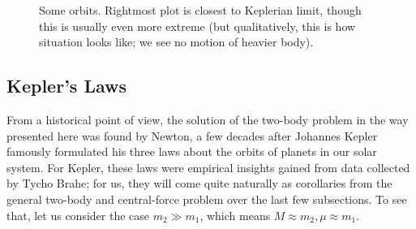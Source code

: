 \documentclass[../class_mech_main.tex]{subfiles}
\begin{document}
\begin{figure}
	\centering

	\hspace{0.1\textwidth}%
	\hspace{0.1\textwidth}%

	\caption{Some orbits. Rightmost plot is closest to Keplerian limit, though this is usually even more extreme (but qualitatively, this is how situation looks like; we see no motion of heavier body).}
	\label{fig:central_force_orbits}
\end{figure}



		\subsection{Kepler's Laws}
From a historical point of view, the solution of the two-body problem in the way presented here was found by Newton, a few decades after Johannes Kepler famously formulated his three laws about the orbits of planets in our solar system. For Kepler, these laws were empirical insights gained from data collected by Tycho Brahe; for us, they will come quite naturally as corollaries from the general two-body and central-force problem over the last few subsections. To see that, let us consider the case $m_2 \gg m_1$, which means $M \approx m_2, \mu \approx m_1$.
\end{document}
